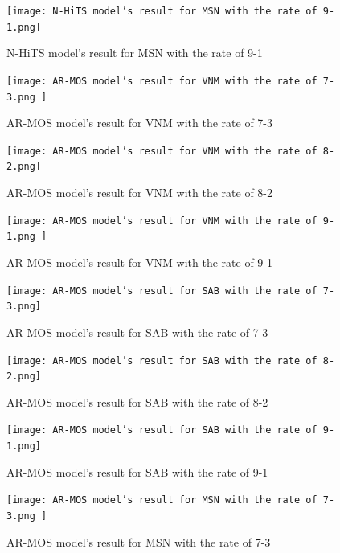 \documentclass{ieeeojies}
\begin{document}
    \begin{figure}[H]
    \begin{minipage}{0.23\textwidth}
    \centering
    \texttt{[image: N-HiTS model’s result for MSN with the rate of 9-1.png]}
    \caption{N-HiTS model’s result for MSN with the rate of 9-1}
    \end{minipage}
    \hfill
    \begin{minipage}{0.23\textwidth}
    \centering
    \texttt{[image: AR-MOS model’s result for VNM with the rate of 7-3.png ]}
    \caption{AR-MOS model’s result for VNM with the rate of 7-3}
    \end{minipage}
    \end{figure}
    
    \begin{figure}[H]
    \begin{minipage}{0.23\textwidth}
    \centering
    \texttt{[image: AR-MOS model’s result for VNM with the rate of 8-2.png]}
    \caption{AR-MOS model’s result for VNM with the rate of 8-2}
    \end{minipage}
    \hfill
    \begin{minipage}{0.23\textwidth}
    \centering
    \texttt{[image: AR-MOS model’s result for VNM with the rate of 9-1.png ]}
    \caption{AR-MOS model’s result for VNM with the rate of 9-1}
    \end{minipage}
    \end{figure}
    
    \begin{figure}[H]
    \begin{minipage}{0.23\textwidth}
    \centering
    \texttt{[image: AR-MOS model’s result for SAB with the rate of 7-3.png]}
    \caption{AR-MOS model’s result for SAB with the rate of 7-3}
    \end{minipage}
    \hfill
    \begin{minipage}{0.23\textwidth}
    \centering
    \texttt{[image: AR-MOS model’s result for SAB with the rate of 8-2.png]}
    \caption{AR-MOS model’s result for SAB with the rate of 8-2}
    \end{minipage}
    \end{figure}
    
    \begin{figure}[H]
    \begin{minipage}{0.23\textwidth}
    \centering
    \texttt{[image: AR-MOS model’s result for SAB with the rate of 9-1.png]}
    \caption{AR-MOS model’s result for SAB with the rate of 9-1}
    \end{minipage}
    \hfill
    \begin{minipage}{0.23\textwidth}
    \centering
    \texttt{[image: AR-MOS model’s result for MSN with the rate of 7-3.png ]}
    \caption{AR-MOS model’s result for MSN with the rate of 7-3}
    \end{minipage}
    \end{figure}
\end{document}
